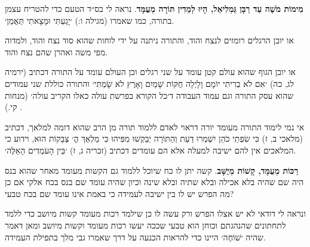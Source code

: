 \documentclass[12pt, openany]{book}
\newcommand{\sethebfont}{
\fontsize{10.5pt}{13.1pt} \selectfont
}
\newcommand{\textblock}[1]{
{\sethebfont #1\\}	
}
\begin{document}
\textblock{\textbf{מִימוֹת מֹשֶׁה עַד רַבָּן גַּמְלִיאֵל, הָיוּ לְמֵדִין תּוֹרָה מְעֻמָּד}. נראה לי בס״ד הטעם כדי להטריח עצמן בתורה, כמו שאמרו {\small (מגילה ו:)} ׳יָגַעְתִּי וּמָצָאתִי תַּאֲמֵן׳.\par או יובן הרגלים רומזים לנצח והוד, והתורה ניתנה על ידי לוחות שהוא סוד נצח והוד, ולמדוה מפי משה ואהרן שהם נצח והוד.\par או יובן הגוף שהוא עולם קטן עומד על שני רגלים וכן העולם עומד על התורה דכתיב {\small (ירמיה לג, כה)} ׳אִם לֹא בְרִיתִי יוֹמָם וָלָיְלָה חֻקּוֹת שָׁמַיִם וָאָרֶץ לֹא שָׂמְתִּי׳ והתורה כוללת שני עמודים שהוא עסק התורה וגם עמוד העבודה ד׳כל הקורא בפרשת עולה כאלו הקריב עולה׳ {\small (מנחות קי.)} .\par אי נמי לימוד התורה מעומד יורה דראוי לאדם ללמוד תורה מן הרב שהוא דומה למלאך, דכתיב {\small (מלאכי ב, ז)} כִּי שִׂפְתֵי כֹהֵן יִשְׁמְרוּ דַעַת וְהַתּוֹרָה יְבַקְשׁוּ מִפִּיהוּ כִּי מַלְאַךְ הֳ׳ צְבָקוֹת הוּא, וידוע כי המלאכים אין להם ישיבה למעלה אלא הם עומדים דכתיב {\small (זכריה ג, ז)} ׳בֵּין הָעֹמְדִים הָאֵלֶּה׳.}
\textblock{\textbf{רַכּוֹת מְעֻמָּד, קָשׁוֹת מְיֻשָּׁב}. קשה יתן לו כח שיוכל ללמוד גם הקשות מעומד מאחר שהוא בנס היה שם שהיה בלא אכילה ובלא שתיה ובלא שינה וכיון שהיה עומד שם בנס בכח אלקי אם כן מה הפרש יש לו בין ישיבה לעמידה כי באמת אינו עומד שם בכח טבעי?\par ונראה לי דודאי לא יש אצלו הפרש ורק עשה לו כן שילמד רכות מעומד קשות מיושב כדי ללמד לתחתונים שהנהגתם וכוחן הוא טבעי שככה יעשו רכות מעומד וקשות מיושב ומאן דאמר שהיה ׳שׁוֹחֶה׳ היינו כדי להראות הכנעה על דרך שאמרו גבי מלך בתפילת העמידה.}

\end{document}

